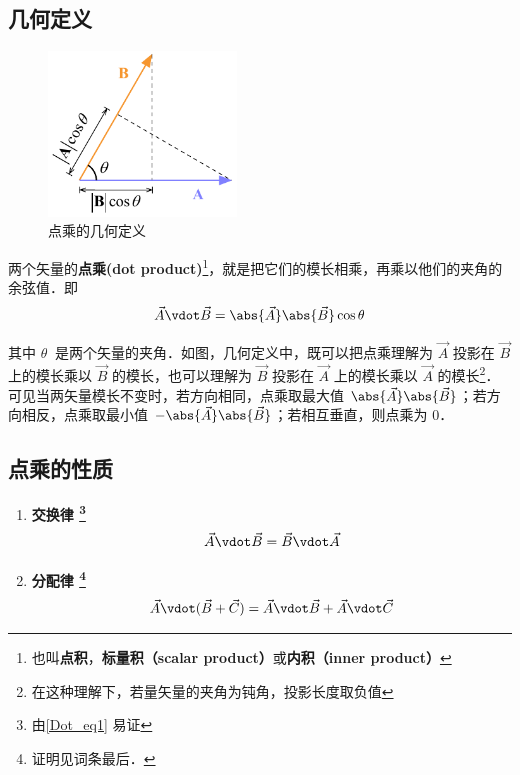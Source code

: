 

\subsection{几何定义}
\begin{figure}[th]
\centering
\includegraphics[width=5cm]{./figures/Dot1.pdf}
\caption{点乘的几何定义}
\end{figure}
两个矢量的\textbf{点乘(dot product)}\footnote{也叫\textbf{点积}，\textbf{标量积（scalar product）}或\textbf{内积（inner product）}}，就是把它们的模长相乘，再乘以他们的夹角的余弦值．即
\begin{equation}\label{Dot_eq1}
\vec A \vdot \vec B = \abs{\vec A} \abs{\vec B} \cos\theta 
\end{equation}

其中 $\theta \ $ 是两个矢量的夹角．如图，几何定义中，既可以把点乘理解为 $\vec A$ 投影在 $\vec B$ 上的模长乘以 $\vec B$ 的模长，也可以理解为 $\vec B$ 投影在 $\vec A$ 上的模长乘以 $\vec A$ 的模长\footnote{在这种理解下，若量矢量的夹角为钝角，投影长度取负值}．可见当两矢量模长不变时，若方向相同，点乘取最大值 $\abs{\vec A}\abs{\vec B}$；若方向相反，点乘取最小值 $-\abs{\vec A}\abs{\vec B}$；若相互垂直，则点乘为 0．

\subsection{点乘的性质} %

\begin{enumerate}
\item \textbf{交换律 \footnote{由\autoref{Dot_eq1} 易证}}
\begin{equation} \vec A \vdot \vec B = \vec B \vdot \vec A \end{equation}

\item \textbf{分配律 \footnote{证明见词条最后．}}
\begin{equation}\label{Dot_eq3}
\vec A \vdot (\vec B + \vec C) = \vec A \vdot \vec B + \vec A \vdot \vec C
\end{equation}
\end{enumerate}

